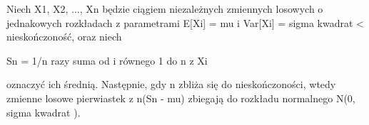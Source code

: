 \documentclass{article}
\begin{document}

Niech X1, X2, ..., Xn będzie ciągiem niezależnych
zmiennych losowych o jednakowych rozkładach z parametrami 
E[Xi] = mu i Var[Xi] = sigma kwadrat < nieskończoność, 
oraz niech

Sn = 1/n razy suma od i równego 1 do n z Xi

oznaczyć ich średnią. Następnie, gdy n zbliża się do 
nieskończoności, wtedy zmienne losowe pierwiastek z n(Sn - mu) 
zbiegają do rozkładu normalnego N(0, sigma kwadrat ).
\end{document}
